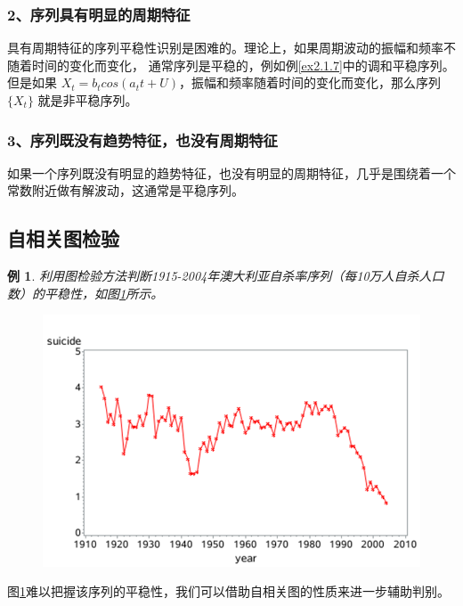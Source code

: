 \documentclass[12pt, a4paper, oneside]{ctexbook}
\newtheorem{example}[theorem]{例}
\begin{document}
\subsubsection{2、序列具有明显的周期特征}
具有周期特征的序列平稳性识别是困难的。理论上，如果周期波动的振幅和频率不随着时间的变化而变化，
通常序列是平稳的，例如例\ref{ex2.1.7}中的调和平稳序列。但是如果
$X_t=b_tcos(a_tt+U)$，振幅和频率随着时间的变化而变化，那么序列$\{X_t\}$
就是非平稳序列。

\subsubsection{3、序列既没有趋势特征，也没有周期特征}
如果一个序列既没有明显的趋势特征，也没有明显的周期特征，几乎是围绕着一个常数附近做有解波动，这通常是平稳序列。

\subsection{自相关图检验}
\begin{example}
    利用图检验方法判断1915-2004年澳大利亚自杀率序列（每10万人自杀人口数）的平稳性，如图\ref{im2_2}所示。
    \begin{figure}[h]
        \centering
        \includegraphics[scale=0.6]{img/2_2.png}
        \caption{}
        \label{im2_2}
    \end{figure}
\end{example}
图\ref{im2_2}难以把握该序列的平稳性，我们可以借助自相关图的性质来进一步辅助判别。
\end{document}
